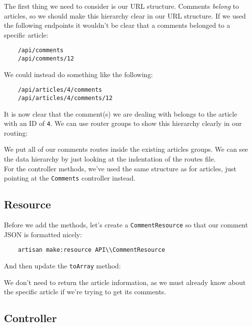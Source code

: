 The first thing we need to consider is our URL structure. Comments \textit{belong} to articles, so we should make this hierarchy clear in our URL structure. If we used the following endpoints it wouldn't be clear that a comments belonged to a specific article:

\begin{verbatim}
    /api/comments
    /api/comments/12
\end{verbatim}

We could instead do something like the following:

\begin{verbatim}
    /api/articles/4/comments
    /api/articles/4/comments/12
\end{verbatim}

It is now clear that the comment(s) we are dealing with belongs to the article with an ID of \texttt{4}. We can use router groups to show this hierarchy clearly in our routing:


We put all of our comments routes inside the existing articles groups. We can see the data hierarchy by just looking at the indentation of the routes file.
\\

For the controller methods, we've used the same structure as for articles, just pointing at the \texttt{Comments} controller instead.


\subsection{Resource}

Before we add the methods, let's create a \texttt{CommentResource} so that our comment JSON is formatted nicely:

\begin{verbatim}
    artisan make:resource API\\CommentResource
\end{verbatim}

And then update the \texttt{toArray} method:


We don't need to return the article information, as we must already know about the specific article if we're trying to get its comments.

\subsection{Controller}

